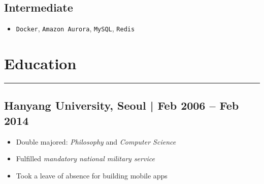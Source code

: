 \documentclass[11pt]{article}
\begin{document}
\subsection*{Intermediate}
\label{sec:org0751bfc}
\begin{itemize}[label=$\circ$,itemsep=-0.5ex]
\item \texttt{Docker}, \texttt{Amazon Aurora}, \texttt{MySQL}, \texttt{Redis}
\end{itemize}

\section*{Education}
\label{sec:orga938c61}
\vspace{-4ex}

\noindent\rule{\textwidth}{0.5pt}
\vspace{-4ex}

\subsection*{Hanyang University, Seoul | Feb 2006 – Feb 2014}
\label{sec:org0496307}
\begin{itemize}[label=$\circ$,itemsep=-0.5ex]
\item Double majored: \emph{Philosophy} and \emph{Computer Science}
\item Fulfilled \emph{mandatory national military service}
\item Took a leave of absence for building mobile apps
\end{itemize}
\end{document}
